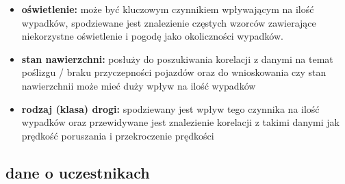 \begin{itemize}
\itemsep1pt\parskip0pt
\item
  \textbf{oświetlenie:} może być kluczowym czynnikiem wpływającym na
  ilość wypadków, spodziewane jest znalezienie częstych wzorców
  zawierające niekorzystne oświetlenie i pogodę jako okoliczności
  wypadków.\\
\item
  \textbf{stan nawierzchni:} posłuży do poszukiwania korelacji z danymi
  na temat poślizgu / braku przyczepności pojazdów oraz do wnioskowania
  czy stan nawierzchnii może mieć duży wpływ na ilość wypadków\\
\item
  \textbf{rodzaj (klasa) drogi:} spodziewany jest wpływ tego czynnika na
  ilość wypadków oraz przewidywane jest znalezienie korelacji z takimi
  danymi jak prędkość poruszania i przekroczenie prędkości
\end{itemize}

\subsection{dane o uczestnikach}\label{dane-o-uczestnikach}

